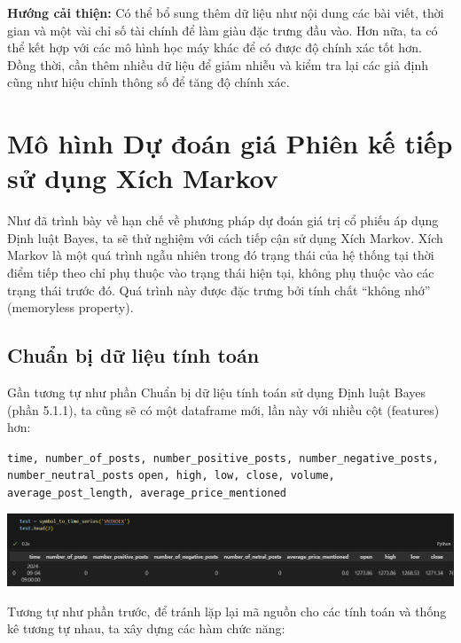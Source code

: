 \textbf{Hướng cải thiện:} Có thể bổ sung thêm dữ liệu như nội dung các bài viết, thời gian và một vài chỉ số tài chính để làm giàu đặc trưng đầu vào. Hơn nữa, ta có thể kết hợp với các mô hình học máy khác để có được độ chính xác tốt hơn. Đồng thời, cần thêm nhiều dữ liệu để giảm nhiễu và kiểm tra lại các giả định cũng như hiệu chỉnh thông số để tăng độ chính xác.

\section{Mô hình Dự đoán giá Phiên kế tiếp sử dụng Xích Markov}

Như đã trình bày về hạn chế về phương pháp dự đoán giá trị cổ phiếu áp dụng Định luật Bayes, ta sẽ thử nghiệm với cách tiếp cận sử dụng Xích Markov. Xích Markov là một quá trình ngẫu nhiên trong đó trạng thái của hệ thống tại thời điểm tiếp theo chỉ phụ thuộc vào trạng thái hiện tại, không phụ thuộc vào các trạng thái trước đó. Quá trình này được đặc trưng bởi tính chất ``không nhớ'' (memoryless property).\\

\subsection{Chuẩn bị dữ liệu tính toán}
Gần tương tự như phần Chuẩn bị dữ liệu tính toán sử dụng Định luật Bayes (phần 5.1.1), ta cũng sẽ có một dataframe mới, lần này với nhiều cột (features) hơn:

\texttt{time, number\_of\_posts, number\_positive\_posts, number\_negative\_posts, number\_neutral\_posts}
\texttt{open, high, low, close, volume, average\_post\_length, average\_price\_mentioned}

\begin{center}
    \includegraphics[width=1\linewidth]{images/C4_9.png}
\end{center}

Tương tự như phần trước, để tránh lặp lại mã nguồn cho các tính toán và thống kê tương tự nhau, ta xây dựng các hàm chức năng:

